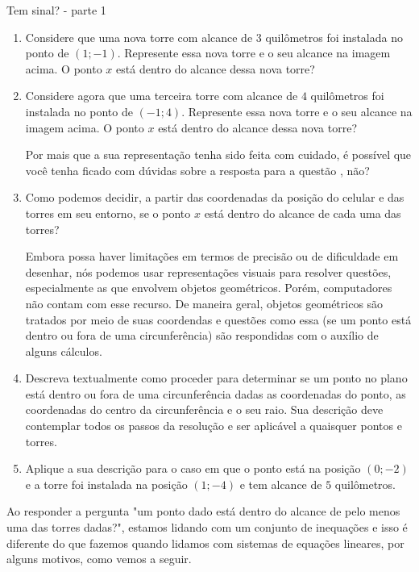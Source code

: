 \clearpage

\begin{task}{Tem sinal? - parte 1}
\begin{enumerate}
\item Considere que uma nova torre com alcance de $3$ quilômetros foi instalada no ponto de $(1;-1)$. Represente essa nova torre e o seu alcance na imagem acima. O ponto $x$ está dentro do alcance dessa nova torre?

\item Considere agora que uma terceira torre com alcance de $4$ quilômetros foi instalada no ponto de $(-1;4)$. Represente essa nova torre e o seu alcance na imagem acima. O ponto $x$ está dentro do alcance dessa nova torre?

Por mais que a sua representação tenha sido feita com cuidado, é possível que você tenha ficado com dúvidas sobre a resposta para a questão , não?

\item Como podemos decidir, a partir das coordenadas da posição do celular e das torres em seu entorno, se o ponto $x$ está dentro do alcance de cada uma das torres?

Embora possa haver limitações em termos de precisão ou de dificuldade em desenhar, nós podemos usar representações visuais para resolver questões, especialmente as que envolvem objetos geométricos. Porém, computadores não contam com esse recurso. De maneira geral, objetos geométricos são tratados por meio de suas coordendas e questões como essa (se um ponto está dentro ou fora de uma circunferência) são respondidas com o auxílio de alguns cálculos.

\item Descreva textualmente como proceder para determinar se um ponto no plano está dentro ou fora de uma circunferência dadas as coordenadas do ponto, as coordenadas do centro da circunferência e o seu raio. Sua descrição deve contemplar todos os passos da resolução e ser aplicável a quaisquer pontos e torres.

\item Aplique a sua descrição para o caso em que o ponto está na posição $(0;-2)$ e a torre foi instalada na posição $(1;-4)$ e tem alcance de $5$ quilômetros.
\end{enumerate}
\end{task}

\label{comp-arr10}

Ao responder a pergunta "um ponto dado está dentro do alcance de pelo menos uma das  torres dadas?", estamos lidando com um conjunto de  inequações e isso é diferente do que fazemos quando lidamos com sistemas de equações lineares, por alguns motivos, como vemos a seguir.

